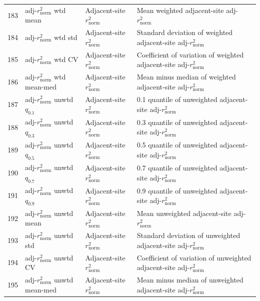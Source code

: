 \begin{longtable}{@{}rllp{7.5cm}@{}}
183 & adj-$r^2_\mathrm{norm}$ wtd mean & Adjacent-site $r^2_\mathrm{norm}$ & Mean weighted adjacent-site adj-$r^2_\mathrm{norm}$ \\
184 & adj-$r^2_\mathrm{norm}$ wtd std & Adjacent-site $r^2_\mathrm{norm}$ & Standard deviation of weighted adjacent-site adj-$r^2_\mathrm{norm}$ \\
185 & adj-$r^2_\mathrm{norm}$ wtd CV & Adjacent-site $r^2_\mathrm{norm}$ & Coefficient of variation of weighted adjacent-site adj-$r^2_\mathrm{norm}$ \\
186 & adj-$r^2_\mathrm{norm}$ wtd mean-med & Adjacent-site $r^2_\mathrm{norm}$ & Mean minus median of weighted adjacent-site adj-$r^2_\mathrm{norm}$ \\
187 & adj-$r^2_\mathrm{norm}$ unwtd $q_{0.1}$ & Adjacent-site $r^2_\mathrm{norm}$ & 0.1 quantile of unweighted adjacent-site adj-$r^2_\mathrm{norm}$ \\
188 & adj-$r^2_\mathrm{norm}$ unwtd $q_{0.3}$ & Adjacent-site $r^2_\mathrm{norm}$ & 0.3 quantile of unweighted adjacent-site adj-$r^2_\mathrm{norm}$ \\
189 & adj-$r^2_\mathrm{norm}$ unwtd $q_{0.5}$ & Adjacent-site $r^2_\mathrm{norm}$ & 0.5 quantile of unweighted adjacent-site adj-$r^2_\mathrm{norm}$ \\
190 & adj-$r^2_\mathrm{norm}$ unwtd $q_{0.7}$ & Adjacent-site $r^2_\mathrm{norm}$ & 0.7 quantile of unweighted adjacent-site adj-$r^2_\mathrm{norm}$ \\
191 & adj-$r^2_\mathrm{norm}$ unwtd $q_{0.9}$ & Adjacent-site $r^2_\mathrm{norm}$ & 0.9 quantile of unweighted adjacent-site adj-$r^2_\mathrm{norm}$ \\
192 & adj-$r^2_\mathrm{norm}$ unwtd mean & Adjacent-site $r^2_\mathrm{norm}$ & Mean unweighted adjacent-site adj-$r^2_\mathrm{norm}$ \\
193 & adj-$r^2_\mathrm{norm}$ unwtd std & Adjacent-site $r^2_\mathrm{norm}$ & Standard deviation of unweighted adjacent-site adj-$r^2_\mathrm{norm}$ \\
194 & adj-$r^2_\mathrm{norm}$ unwtd CV & Adjacent-site $r^2_\mathrm{norm}$ & Coefficient of variation of unweighted adjacent-site adj-$r^2_\mathrm{norm}$ \\
195 & adj-$r^2_\mathrm{norm}$ unwtd mean-med & Adjacent-site $r^2_\mathrm{norm}$ & Mean minus median of unweighted adjacent-site adj-$r^2_\mathrm{norm}$ \\
\end{longtable}
